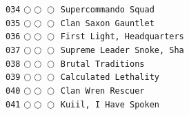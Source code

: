 \documentclass[a4paper,landscape]{article}
\begin{document}
\begin{multicols*}{5}
\texttt{034} \(\bigcirc\!\bigcirc\!\bigcirc\)  \texttt{Supercommando Squad} \vspace{-0.3mm}\\ 
\texttt{035} \(\bigcirc\!\bigcirc\!\bigcirc\)  \texttt{Clan Saxon Gauntlet} \vspace{-0.3mm}\\ 
\texttt{036} \(\bigcirc\!\bigcirc\!\bigcirc\)  \texttt{First Light, Headquarters} \vspace{-0.3mm}\\ 
\texttt{037} \(\bigcirc\!\bigcirc\!\bigcirc\)  \texttt{Supreme Leader Snoke, Sha} \vspace{-0.3mm}\\ 
\texttt{038} \(\bigcirc\!\bigcirc\!\bigcirc\)  \texttt{Brutal Traditions} \vspace{-0.3mm}\\ 
\texttt{039} \(\bigcirc\!\bigcirc\!\bigcirc\)  \texttt{Calculated Lethality} \vspace{-0.3mm}\\ 
\texttt{040} \(\bigcirc\!\bigcirc\!\bigcirc\)  \texttt{Clan Wren Rescuer} \vspace{-0.3mm}\\ 
\texttt{041} \(\bigcirc\!\bigcirc\!\bigcirc\)  \texttt{Kuiil, I Have Spoken} \vspace{-0.3mm}\\ 

\end{multicols*}
\end{document}
